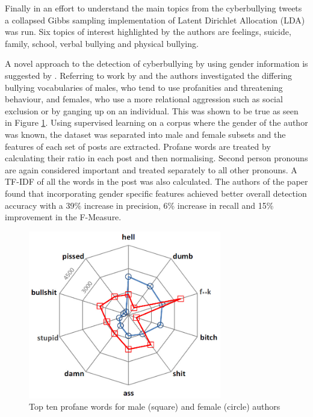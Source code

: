 Finally in an effort to understand the main topics from the cyberbullying tweets a collapsed Gibbs sampling implementation of Latent Dirichlet Allocation (LDA) \cite{griffiths_finding_2004} was run. Six topics of interest highlighted by the authors are feelings, suicide, family, school, verbal bullying and physical bullying.


A novel approach to the detection of cyberbullying by using gender information is suggested by \citet{dadvar_improved_2012} . Referring to work by \citet{argamon_gender_2003} and \citet{chisholm_cyberspace_2006} the authors investigated the differing bullying vocabularies of males, who tend to use profanities and threatening behaviour, and females, who use a more relational aggression such as social exclusion or by ganging up on an individual. This was shown to be true as seen in Figure \ref{fig:dadvar_improved_2012_01}. Using supervised learning on a corpus where the gender of the author was known, the dataset was separated into male and female subsets and the features of each set of posts are extracted. Profane words are treated by calculating their ratio in each post and then normalising. Second person pronouns are again considered important and treated separately to all other pronouns. A TF-IDF of all the words in the post was also calculated. The authors of the paper found that incorporating gender specific features achieved better overall detection accuracy with a 39\% increase in precision, 6\% increase in recall and 15\% improvement in the F-Measure.


\begin{figure}[htbp]
	\centering
	\includegraphics[width=0.75\textwidth]{Figures/Chapter3/dadvar_improved_2012_01.jpg}
	\caption[Top ten profane words for male and female authors]{Top ten profane words for male (square) and female (circle) authors \citet{dadvar_improved_2012}}
	\label{fig:dadvar_improved_2012_01}
\end{figure}
 

